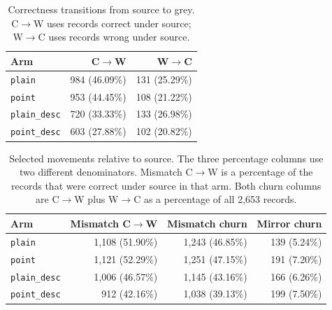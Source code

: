 \begin{table}[ht]
\centering
\caption[Grey correctness transitions]{Correctness transitions from source to
grey. C$\rightarrow$W uses records correct under source; W$\rightarrow$C uses
records wrong under source.}
\label{tab:rq1-transitions-compact}
\begin{tabular}{lrr}
\toprule
Arm & C$\rightarrow$W & W$\rightarrow$C \\
\midrule
\texttt{plain} & 984 (46.09\%) & 131 (25.29\%) \\
\texttt{point} & 953 (44.45\%) & 108 (21.22\%) \\
\texttt{plain\_desc} & 720 (33.33\%) & 133 (26.98\%) \\
\texttt{point\_desc} & 603 (27.88\%) & 102 (20.82\%) \\
\bottomrule
\end{tabular}
\end{table}

\begin{table}[ht]
\centering
\caption[Mismatch and mirror correctness movement]{Selected movements relative
to source. The three percentage columns use two different denominators. Mismatch
C$\rightarrow$W is a percentage of the records that were correct under source in
that arm. Both churn columns are C$\rightarrow$W plus W$\rightarrow$C as a
percentage of all 2,653 records.}
\label{tab:rq1-churn-compact}
\begin{tabular}{lrrr}
\toprule
Arm & Mismatch C$\rightarrow$W & Mismatch churn & Mirror churn \\
\midrule
\texttt{plain} & 1,108 (51.90\%) & 1,243 (46.85\%) & 139 (5.24\%) \\
\texttt{point} & 1,121 (52.29\%) & 1,251 (47.15\%) & 191 (7.20\%) \\
\texttt{plain\_desc} & 1,006 (46.57\%) & 1,145 (43.16\%) & 166 (6.26\%) \\
\texttt{point\_desc} & 912 (42.16\%) & 1,038 (39.13\%) & 199 (7.50\%) \\
\bottomrule
\end{tabular}
\end{table}
